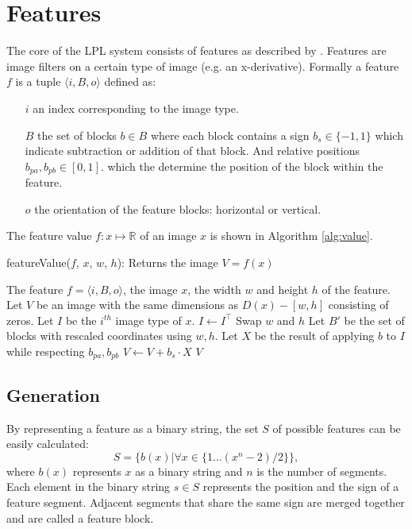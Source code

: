 \documentclass[a4paper,11pt]{article}
\begin{document}
\section*{Features}
The core of the LPL system consists of features as described by
\cite{dlagnekov_thesis, zhang,naturaltext}. Features are image filters on a
certain type of image (e.g. an x-derivative). Formally a feature $f$ is a
tuple $\langle i, B, o \rangle$ defined as:
\begin{itemize}
	\item[$i$]{an index corresponding to the image type.}
	\item[$B$]{the set of blocks $b \in B$ where each block contains a sign
	$b_s \in \{-1,1\}$ which indicate subtraction or addition of that block.
	And relative positions $b_{pa},b_{pb} \in [0,1]$. which the determine the
	position of the block within the feature.}
	\item[$o$]{the orientation of the feature blocks: horizontal or vertical.}
\end{itemize}
The feature value $f:x\mapsto\mathbb{R}$ of an image $x$ is shown in Algorithm
\ref{alg:value}.
\begin{algorithm}
	\caption{featureValue($f$, $x$, $w$, $h$): Returns the image $V = f(x)$}
	\begin{algorithmic}[1]
	\REQUIRE The feature $f = \langle i, B, o \rangle$, the image $x$, the width $w$ and height $h$ of the feature.
	\medskip
	\STATE Let $V$ be an image with the same dimensions as $D(x)-[w, h]$ consisting of zeros.
	\STATE Let $I$ be the $i^{th}$ image type of $x$.
		\STATE $I \leftarrow I^\top$
		\STATE Swap $w$ and $h$
	\ENDIF
	\STATE Let $B'$ be the set of blocks with rescaled coordinates using $w,h$.
		\STATE Let $X$ be the result of applying $b$ to $I$ while respecting $b_{pa}, b_{pb}$
		\STATE $V \leftarrow V + b_s \cdot X$
	\ENDFOR
	\RETURN $V$
	\end{algorithmic}
\label{alg:value}
\end{algorithm}

\subsection*{Generation}
By representing a feature as a binary string, the set $S$ of possible features
can be easily calculated:
$$S = \{b(x) | \forall x \in \{1\ldots(x^n-2)/2\}\},$$
where $b(x)$ represents $x$ as a binary string and $n$ is the number of
segments. Each element in the binary string $s \in S$ represents the position
and the sign of a feature segment. Adjacent segments that share the same sign
are merged together and are called a feature block.
\end{document}
